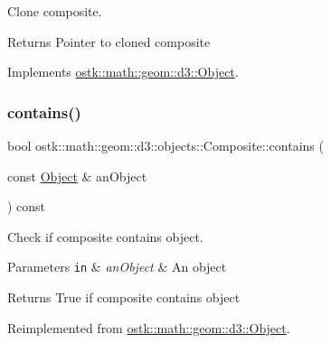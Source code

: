 Clone composite. 

\begin{DoxyReturn}{Returns}
Pointer to cloned composite 
\end{DoxyReturn}


Implements \hyperlink{classostk_1_1math_1_1geom_1_1d3_1_1_object_a676013f9555f6492687f9809b2db887b}{ostk\+::math\+::geom\+::d3\+::\+Object}.

\mbox{\label{classostk_1_1math_1_1geom_1_1d3_1_1objects_1_1_composite_abe810bb7e17c444b1b556053e32750d1}} 
\subsubsection{\texorpdfstring{contains()}{contains()}\hspace{0.1cm}{\footnotesize\ttfamily [1/2]}}
{\footnotesize\ttfamily bool ostk\+::math\+::geom\+::d3\+::objects\+::\+Composite\+::contains (\begin{DoxyParamCaption}\item[{const \hyperlink{classostk_1_1math_1_1geom_1_1d3_1_1_object}{Object} \&}]{an\+Object }\end{DoxyParamCaption}) const\hspace{0.3cm}{\ttfamily [virtual]}}



Check if composite contains object. 


\begin{DoxyParams}[1]{Parameters}
\mbox{\tt in}  & {\em an\+Object} & An object \\
\hline
\end{DoxyParams}
\begin{DoxyReturn}{Returns}
True if composite contains object 
\end{DoxyReturn}


Reimplemented from \hyperlink{classostk_1_1math_1_1geom_1_1d3_1_1_object_a97edbd679b50c4663d3ab20c65cea4b9}{ostk\+::math\+::geom\+::d3\+::\+Object}.

\mbox{\label{classostk_1_1math_1_1geom_1_1d3_1_1objects_1_1_composite_a54395e684abc0b64a629808e3c478e52}} 
